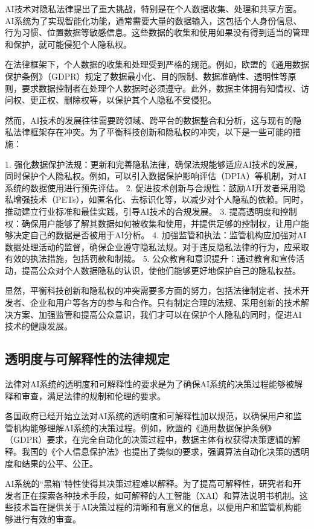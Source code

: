 AI技术对隐私法律提出了重大挑战，特别是在个人数据收集、处理和共享方面。AI系统为了实现智能化功能，通常需要大量的数据输入，这包括个人身份信息、行为习惯、位置数据等敏感信息。这些数据的收集和使用如果没有得到适当的管理和保护，就可能侵犯个人隐私权。

在法律框架下，个人数据的收集和处理受到严格的规范。例如，欧盟的《通用数据保护条例》（GDPR）规定了数据最小化、目的限制、数据准确性、透明性等原则，要求数据控制者在处理个人数据时必须遵守。此外，数据主体拥有知情权、访问权、更正权、删除权等，以保护其个人隐私不受侵犯。

然而，AI技术的发展往往需要跨领域、跨平台的数据整合和分析，这与现有的隐私法律框架存在冲突。为了平衡科技创新和隐私权的冲突，以下是一些可能的措施：

1. 强化数据保护法规：更新和完善隐私法律，确保法规能够适应AI技术的发展，同时保护个人隐私权。例如，可以引入数据保护影响评估（DPIA）等机制，对AI系统的数据使用进行预先评估。
2. 促进技术创新与合规性：鼓励AI开发者采用隐私增强技术（PETs），如匿名化、去标识化等，以减少对个人隐私的依赖。同时，推动建立行业标准和最佳实践，引导AI技术的合规发展。
3. 提高透明度和控制权：确保用户能够了解其数据如何被收集和使用，并提供足够的控制权，让用户能够决定自己的数据是否被用于AI分析。
4. 加强监管和执法：监管机构应加强对AI数据处理活动的监督，确保企业遵守隐私法规。对于违反隐私法律的行为，应采取有效的执法措施，包括罚款和制裁。
5. 公众教育和意识提升：通过教育和宣传活动，提高公众对个人数据隐私的认识，使他们能够更好地保护自己的隐私权益。

显然，平衡科技创新和隐私权的冲突需要多方面的努力，包括法律制定者、技术开发者、企业和用户等各方的参与和合作。只有制定合理的法规、采用创新的技术解决方案、加强监管和提高公众意识，我们才可以在保护个人隐私的同时，促进AI技术的健康发展。

\subsection{透明度与可解释性的法律规定}

法律对AI系统的透明度和可解释性的要求是为了确保AI系统的决策过程能够被解释和审查，满足法律的规制和伦理的要求。

各国政府已经开始立法对AI系统的透明度和可解释性加以规范，以确保用户和监管机构能够理解AI系统的决策过程。例如，欧盟的《通用数据保护条例》（GDPR）要求，在完全自动化的决策过程中，数据主体有权获得决策逻辑的解释。我国的《个人信息保护法》也提出了类似的要求，强调算法自动化决策的透明度和结果的公平、公正。

AI系统的“黑箱”特性使得其决策过程难以解释。为了提高可解释性，研究者和开发者正在探索各种技术手段，如可解释的人工智能（XAI）和算法说明书机制。这些技术旨在提供关于AI决策过程的清晰和有意义的信息，以便用户和监管机构能够进行有效的审查。

